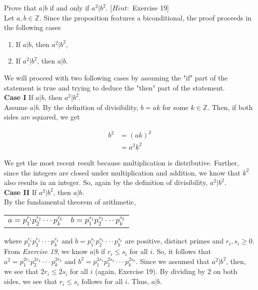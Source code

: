 \documentclass[12pt]{article}
\newcommand{\Z}{\mathbb{Z}}
\newenvironment{problem}[2][Problem]{\begin{trivlist}
\item[\hskip \labelsep {\bfseries #1}\hskip \labelsep {\bfseries #2.}]}{\end{trivlist}}
\begin{document}
\begin{problem}{4}
Prove that $a|b$ if and only if $a^2|b^2$. [$Hint:$ Exercise 19] \\

\noindent
Let $a,b \in \Z$. Since the proposition features a biconditional, the proof proceeds in the following cases

\begin{center}
\begin{enumerate}
\item If $a|b$, then $a^2|b^2$,
\item If $a^2|b^2$, then $a|b$.
\end{enumerate}
\end{center}

\noindent
We will proceed with two following cases by assuming the "if" part of the statement is true and trying to deduce the "then" part of the statement. \\

\noindent
\textbf{Case I} If $a|b$, then $a^2|b^2$. \\

\noindent
Assume $a|b$. By the definition of divisibility, $b=ak$ for some $k \in \Z$. Then, if both sides are squared, we get

\begin{align*}
b^2 & = (ak)^2 \\
& = a^2k^2
\end{align*}

\noindent
We get the most recent result because multiplication is distributive. Further, since the integers are closed under multiplication and addition, we know that $k^2$ also results in an integer. So, again by the definition of divisibility, $a^2|b^2$. \\

\noindent
\textbf{Case II} If $a^2|b^2$, then $a|b$. \\

\noindent
By the fundamental theorem of arithmetic,

\begin{center}
\begin{tabular}{cc}
 $a=p^{r_1}_1p^{r_2}_2 \cdot \cdot \cdot p^{r_k}_k$ & $b=p^{s_1}_1p^{s_2}_2 \cdot \cdot \cdot p^{s_k}_k$ \\
\end{tabular}
\end{center}

\noindent
where $p^{r_1}_1p^{r_2}_2 \cdot \cdot \cdot p^{r_k}_k$ and $b=p^{s_1}_1p^{s_2}_2 \cdot \cdot \cdot p^{s_k}_k$ are positive, distinct primes and $r_i, s_i \geq 0$. From \textit{Exercise 19}, we know $a|b$ if $r_i \leq s_i$ for all $i$. So, it follows that $a^2=p^{2r_1}_1p^{2r_2}_2 \cdot \cdot \cdot p^{2r_k}_k$ and $b^2=p^{2s_1}_1p^{2s_2}_2 \cdot \cdot \cdot p^{2s_k}_k$. Since we assumed that $a^2|b^2$, then, we see that $2r_i \leq 2s_i$ for all $i$ (again, Exercise 19). By dividing by $2$ on both sides, we see that $r_i \leq s_i$ follows for all $i$. Thus, $a|b$. \\


\end{problem}
\end{document}
